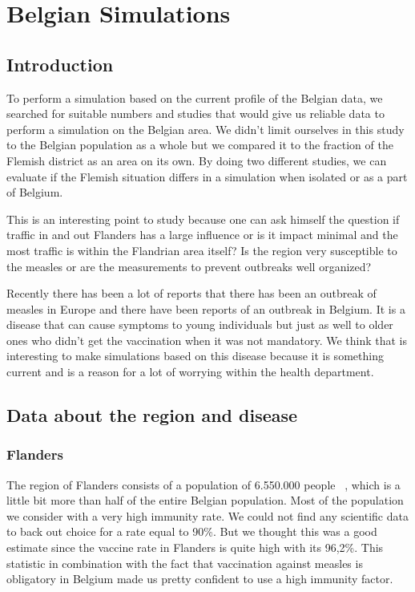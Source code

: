 \documentclass[runningheads]{llncs}
\begin{document}
	\newpage
	
	\section{Belgian Simulations}
	\subsection{Introduction}
	To perform a simulation based on the current profile of the Belgian data, we searched for suitable numbers and studies that would give us reliable data to perform a simulation on the Belgian area.
	We didn't limit ourselves in this study to the Belgian population as a whole but we compared it to the fraction of the Flemish district as an area on its own.
	By doing two different studies, we can evaluate if the Flemish situation differs in a simulation when isolated or as a part of Belgium.
	
	This is an interesting point to study because one can ask himself the question if traffic in and out Flanders has a large influence or is it impact minimal and the most traffic is within the Flandrian area itself? Is the region very susceptible to the measles or are the measurements to prevent outbreaks well organized?
	
	Recently there has been a lot of reports that there has been an outbreak of measles in Europe and there have been reports of an outbreak in Belgium. It is a disease that can cause symptoms to young individuals but just as well to older ones who didn't get the vaccination when it was not mandatory. We think that is interesting to make simulations based on this disease because it is something current and is a reason for a lot of worrying within the health department.
	
	\subsection{Data about the region and disease}
	
	\subsubsection{Flanders} 
	The region of Flanders consists of a population of 6.550.000 people ~\cite{1}, which is a little bit more than half of the entire Belgian population. Most of the population we consider with a very high immunity rate. We could not find any scientific data to back out choice for a rate equal to 90\%. But we thought this was a good estimate since the vaccine rate in Flanders is quite high with its 96,2\%. This statistic in combination with the fact that vaccination against measles is obligatory in Belgium made us pretty confident to use a high immunity factor. ~\cite{2} ~\cite{3} ~\cite{4}\\
	
\end{document}

